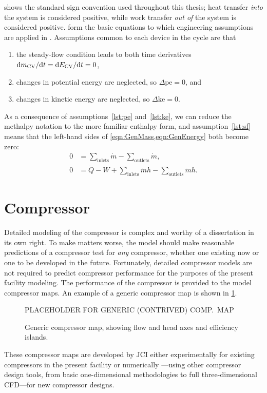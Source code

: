  shows the standard sign convention used throughout this thesis; 
\ie{} heat transfer \emph{into} the system is considered positive, 
while work transfer \emph{out of} the system is considered positive.
 form the basic equations to which 
engineering assumptions are applied in .
Assumptions common to each device in the cycle are that
\begin{enumerate}
  \item the steady-flow condition leads to both time derivatives $\mathop{}\!\mathrm{d}{m_{\text{CV}}}/\!\mathop{}\!\mathrm{d}{t} = \mathop{}\!\mathrm{d}{E_{\text{CV}}}/\!\mathop{}\!\mathrm{d}{t} = 0$, \label{lst:sf}
  \item changes in potential energy are neglected, so $\Delta \text{pe} = 0$, and \label{lst:pe}
  \item changes in kinetic energy are neglected, so $\Delta \text{ke} = 0$. \label{lst:ke}
\end{enumerate}
As a consequence of assumptions~\ref{lst:pe} and~\ref{lst:ke},
we can reduce the methalpy notation to the more familiar enthalpy form,
and assumption~\ref{lst:sf} means that the left-hand sides of \cref{eqn:GenMass,eqn:GenEnergy} both become zero:
\begin{align}
  0 &= \sum_{\text{inlets}}{\dot{m}} - \sum_{\text{outlets}}{\dot{m}}, \\
  0 &= \dot{Q} - \dot{W} + \sum_{\text{inlets}}{\dot{m}h} - \sum_{\text{outlets}}{\dot{m}h}.
\end{align}

\section{Compressor} \label{sec:Compressor}
Detailed modeling of the compressor is complex and worthy of a dissertation in its own right. 
To make matters worse, the model should make reasonable predictions 
of a compressor test for \emph{any} compressor, 
whether one existing now or one to be developed in the future.
Fortunately, detailed compressor models are not required 
to predict compressor performance for the purposes of the present facility modeling. 
The performance of the compressor is provided to the model \via{} compressor maps. 
An example of a generic compressor map is shown in \cref{fig:GenMap}. 
\begin{figure}[htbp]
  \centering
  PLACEHOLDER FOR GENERIC (CONTRIVED) COMP.~MAP
  \caption{Generic compressor map, showing flow and head axes and efficiency islands.}
  \label{fig:GenMap}
\end{figure}
These compressor maps are developed by JCI either experimentally 
for existing compressors in the present facility or numerically%
---using other compressor design tools, from basic one-dimensional methodologies
to full three-dimensional CFD---for new compressor designs.

